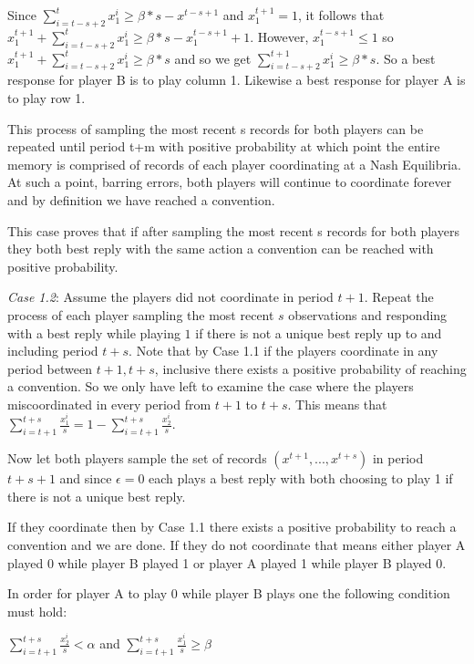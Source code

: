 \documentclass{article}
\begin{document}
Since $\sum\limits_{i=t-s+2}^t x^i_1 \geq \beta*s-x^{t-s+1}$ and $x^{t+1}_1=1$, 
\vskip6pt
it follows that $x_1^{t+1}+\sum\limits_{i=t-s+2}^t x^i_1 \geq \beta*s-x^{t-s+1}_1+1$.
\vskip6pt
However, $x^{t-s+1}_1 \leq 1$ so $x_1^{t+1}+\sum\limits_{i=t-s+2}^t x^i_1 \geq \beta*s$ and so we get $\sum\limits_{i=t-s+2}^{t+1} x^i_1 \geq \beta*s$. So a best response for player B is to play column 1. Likewise a best response for player A is to play row 1.

This process of sampling the most recent s records for both players can be repeated until period t+m with positive probability at which point the entire memory is comprised of records of each player coordinating at a Nash Equilibria. At such a point, barring errors, both players will continue to coordinate forever and by definition we have reached a convention.

This case proves that if after sampling the most recent s records for both players they both best reply with the same action a convention can be reached with positive probability.

\vskip16pt
\textit{Case 1.2}: Assume the players did not coordinate in period $t+1$. Repeat the process of each player sampling the most recent $s$ observations and responding with a best reply while playing $1$ if there is not a unique best reply up to and including period $t+s$. Note that by Case 1.1 if the players coordinate in any period between $t+1,t+s$, inclusive there exists a positive probability of reaching a convention. So we only have left to examine the case where the players miscoordinated in every period from $t+1$ to $t+s$. This means that $\sum\limits_{i=t+1}^{t+s} \frac{x_1^i}{s}=1-\sum\limits_{i=t+1}^{t+s} \frac{x_2^i}{s}$.

Now let both players sample the set of records $(x^{t+1},...,x^{t+s})$ in period $t+s+1$ and since $\epsilon=0$ each plays a best reply with both choosing to play 1 if there is not a unique best reply.

If they coordinate then by Case 1.1 there exists a positive probability to reach a convention and we are done. If they do not coordinate that means either player A played 0 while player B played 1 or player A played 1 while player B played 0.

In order for player A to play 0 while player B plays one the following condition must hold:

$\sum\limits_{i=t+1}^{t+s} \frac{x^i_2}{s} < \alpha$
and
$\sum\limits_{i=t+1}^{t+s} \frac{x^i_1}{s} \geq \beta$
\end{document}
